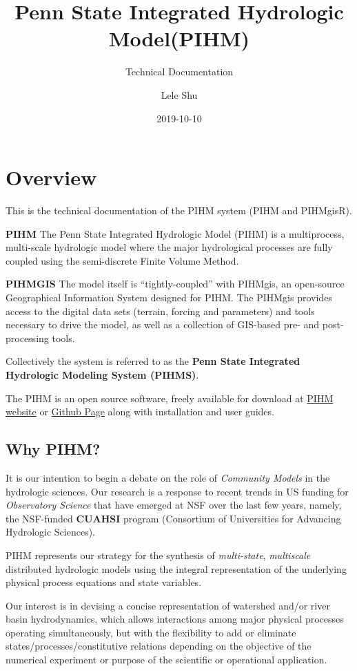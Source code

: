 \documentclass[]{scrbook}
\title{Penn State Integrated Hydrologic Model(PIHM)}
\subtitle{Technical Documentation}
\author{Lele Shu}
\date{2019-10-10}
\begin{document}
\maketitle

{
\setcounter{tocdepth}{1}
\tableofcontents
}
\chapter{Overview}\label{Overview}

This is the technical documentation of the PIHM system (PIHM and
PIHMgisR).

\textbf{PIHM} The Penn State Integrated Hydrologic Model (PIHM) is a
multiprocess, multi-scale hydrologic model where the major hydrological
processes are fully coupled using the semi-discrete Finite Volume
Method.

\textbf{PIHMGIS} The model itself is ``tightly-coupled'' with PIHMgis,
an open-source Geographical Information System designed for PIHM. The
PIHMgis provides access to the digital data sets (terrain, forcing and
parameters) and tools necessary to drive the model, as well as a
collection of GIS-based pre- and post-processing tools.

Collectively the system is referred to as the \textbf{Penn State
Integrated Hydrologic Modeling System (PIHMS)}.

The PIHM is an open source software, freely available for download at
\href{www.pihm.psu.edu}{PIHM website} or
\href{https://github.com/shulele/PIHM++}{Github Page} along with
installation and user guides.

\section{Why PIHM?}\label{why-pihm}

It is our intention to begin a debate on the role of \emph{Community
Models} in the hydrologic sciences. Our research is a response to recent
trends in US funding for \emph{Observatory Science} that have emerged at
NSF over the last few years, namely, the NSF-funded \textbf{CUAHSI}
program (Consortium of Universities for Advancing Hydrologic Sciences).

PIHM represents our strategy for the synthesis of \emph{multi-state},
\emph{multiscale} distributed hydrologic models using the integral
representation of the underlying physical process equations and state
variables.

Our interest is in devising a concise representation of watershed and/or
river basin hydrodynamics, which allows interactions among major
physical processes operating simultaneously, but with the flexibility to
add or eliminate states/processes/constitutive relations depending on
the objective of the numerical experiment or purpose of the scientific
or operational application.
\end{document}
